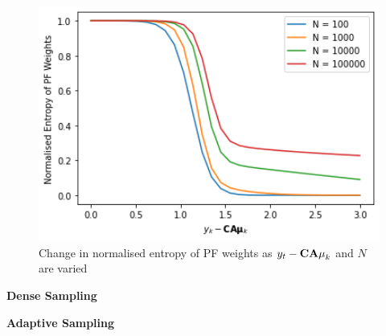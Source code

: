 \documentclass[../main.tex]{subfiles}
\begin{document}
\begin{figure}[h!]
	\centering
	\includegraphics[width=12.0cm]{../plots/2__2__2__sample_impoverishment.png}
	\caption{Change in normalised entropy of PF weights as $y_t - {\bf CA\mu}_k$ and $N$ are varied}
	\label{fig:2__2__2__sample_impoverishment}
\end{figure}

\textbf{Dense Sampling}



\textbf{Adaptive Sampling}
\end{document}
